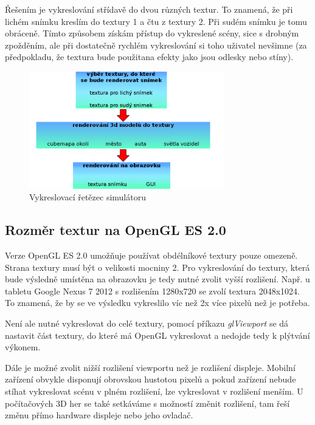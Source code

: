 \documentclass[11pt,twoside,a4paper]{book}
\begin{document}
Řešením je vykreslování střídavě do dvou různých textur. To znamená, že při lichém snímku kreslím do textury 1 a čtu z textury 2. Při sudém snímku je tomu obráceně. Tímto způsobem získám přístup do vykreslené scény, sice s drobným zpožděním, ale při dostatečně rychlém vykreslování si toho uživatel nevšimne (za předpokladu, že textura bude použita\linebreak na efekty jako jsou odlesky nebo stíny).

\begin{center}
\begin{figure}[h!]
\includegraphics[width=85mm]{figures/render-schema.png}
\caption{Vykreslovací řetězec simulátoru}
\end{figure}
\end{center}

\subsection{Rozměr textur na OpenGL ES 2.0}
Verze OpenGL ES 2.0 umožňuje používat obdélníkové textury pouze omezeně. Strana textury musí být o velikosti mocniny 2.
Pro vykreslování do textury, která bude výsledně umístěna na obrazovku je tedy nutné zvolit vyšší rozlišení. Např. u tabletu Google Nexus 7 2012 s rozlišením 1280x720 se zvolí textura 2048x1024. To znamená, že by se ve výsledku vykreslilo víc než 2x více pixelů než je potřeba.

Není ale nutné vykreslovat do celé textury, pomocí příkazu \textit{glViewport} se dá nastavit část textury, do které má OpenGL vykreslovat a nedojde tedy k plýtvání výkonem.

Dále je možné zvolit nižší rozlišení viewportu než je rozlišení displeje. Mobilní zařízení obvykle disponují obrovskou hustotou pixelů a pokud zařízení nebude stíhat vykreslovat scénu v plném rozlišení, lze vykreslovat v rozlišení menším. U počítačových 3D her se také setkáváme s možností změnit rozlišení, tam řeší změnu přímo hardware displeje nebo jeho ovladač.
\end{document}
